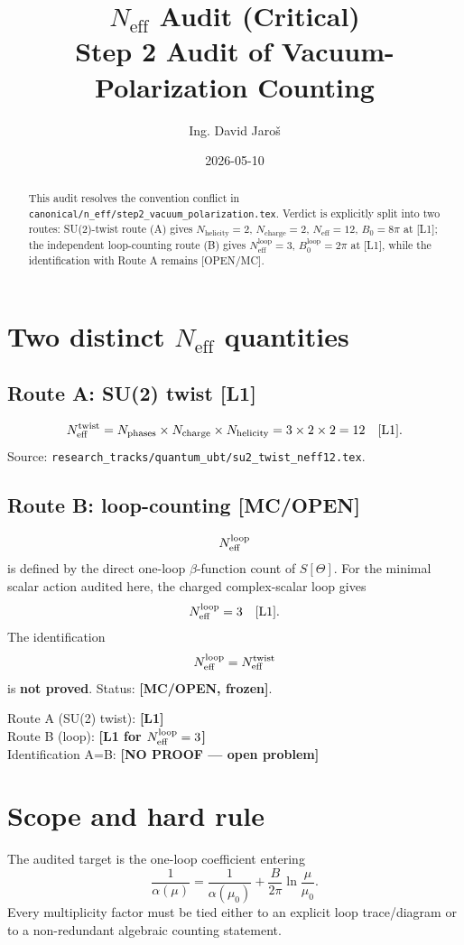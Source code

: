 \documentclass[12pt,a4paper]{article}
\title{$N_{\mathrm{eff}}$ Audit (Critical)\\\large Step 2 Audit of Vacuum-Polarization Counting}
\author{Ing. David Jaro\v{s}}
\date{2026-05-10}
\begin{document}
\maketitle

\begin{abstract}
This audit resolves the convention conflict in
\texttt{canonical/n\_eff/step2\_vacuum\_polarization.tex}.
Verdict is explicitly split into two routes:
SU(2)-twist route (A) gives
$N_{\mathrm{helicity}}=2$, $N_{\mathrm{charge}}=2$,
$N_{\mathrm{eff}}=12$, $B_0=8\pi$ at [L1];
the independent loop-counting route (B) gives
$N_{\mathrm{eff}}^{\mathrm{loop}}=3$, $B_0^{\mathrm{loop}}=2\pi$ at [L1],
while the identification with Route A remains [OPEN/MC].
\end{abstract}

\tableofcontents

\section{Two distinct $N_{\mathrm{eff}}$ quantities}

\subsection{Route A: SU(2) twist [L1]}
\[
N_{\rm eff}^{\rm twist} = N_{\rm phases}\times N_{\rm charge}
\times N_{\rm helicity} = 3\times 2\times 2 = 12 \quad [\mathrm{L1}].
\]
Source: \texttt{research\_tracks/quantum\_ubt/su2\_twist\_neff12.tex}.

\subsection{Route B: loop-counting [MC/OPEN]}
\[
N_{\rm eff}^{\rm loop}
\]
is defined by the direct one-loop $\beta$-function count of $S[\Theta]$.
For the minimal scalar action audited here, the charged complex-scalar loop gives
\[
N_{\rm eff}^{\rm loop} = 3 \quad [\mathrm{L1}].
\]
The identification
\[
N_{\rm eff}^{\rm loop} = N_{\rm eff}^{\rm twist}
\]
is \textbf{not proved}. Status: \textbf{[MC/OPEN, frozen]}.

\begin{statusbox}
Route A (SU(2) twist): \textbf{[L1]}\\
Route B (loop): \textbf{[L1 for $N_{\rm eff}^{\rm loop}=3$]}\\
Identification A=B: \textbf{[NO PROOF --- open problem]}
\end{statusbox}

\section{Scope and hard rule}
The audited target is the one-loop coefficient entering
\begin{equation}
\frac{1}{\alpha(\mu)}=\frac{1}{\alpha(\mu_0)}+\frac{B}{2\pi}\ln\frac{\mu}{\mu_0}.
\end{equation}
Every multiplicity factor must be tied either to an explicit loop trace/diagram
or to a non-redundant algebraic counting statement.
\end{document}

